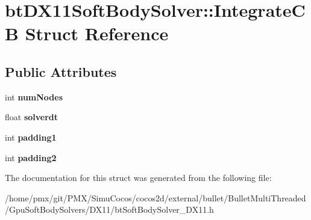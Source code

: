 \hypertarget{structbtDX11SoftBodySolver_1_1IntegrateCB}{}\section{bt\+D\+X11\+Soft\+Body\+Solver\+:\+:Integrate\+CB Struct Reference}
\label{structbtDX11SoftBodySolver_1_1IntegrateCB}
\subsection*{Public Attributes}
\begin{DoxyCompactItemize}
\item 
\mbox{\label{structbtDX11SoftBodySolver_1_1IntegrateCB_a47b57acf5bb6bb8267faeb36c4b8737d}} 
int {\bfseries num\+Nodes}
\item 
\mbox{\label{structbtDX11SoftBodySolver_1_1IntegrateCB_a9986c99f3fdd10839590d6d56d8af0f0}} 
float {\bfseries solverdt}
\item 
\mbox{\label{structbtDX11SoftBodySolver_1_1IntegrateCB_a414d1dae69ed7b43ebd817bce3c3e48e}} 
int {\bfseries padding1}
\item 
\mbox{\label{structbtDX11SoftBodySolver_1_1IntegrateCB_ab2598bcc288783dbcb98711a18f100e0}} 
int {\bfseries padding2}
\end{DoxyCompactItemize}


The documentation for this struct was generated from the following file\+:\begin{DoxyCompactItemize}
\item 
/home/pmx/git/\+P\+M\+X/\+Simu\+Cocos/cocos2d/external/bullet/\+Bullet\+Multi\+Threaded/\+Gpu\+Soft\+Body\+Solvers/\+D\+X11/bt\+Soft\+Body\+Solver\+\_\+\+D\+X11.\+h\end{DoxyCompactItemize}
